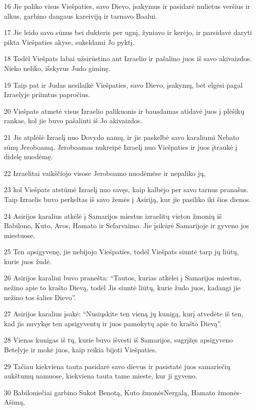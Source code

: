\par 16 Jie paliko visus Viešpaties, savo Dievo, įsakymus ir pasidarė nulietus veršius ir alkus, garbino dangaus kareiviją ir tarnavo Baalui. 
\par 17 Jie leido savo sūnus bei dukteris per ugnį, žyniavo ir kerėjo, ir parsidavė daryti pikta Viešpaties akyse, sukeldami Jo pyktį. 
\par 18 Todėl Viešpats labai užsirūstino ant Izraelio ir pašalino juos iš savo akivaizdos. Nieko neliko, išskyrus Judo giminę. 
\par 19 Taip pat ir Judas nesilaikė Viešpaties, savo Dievo, įsakymų, bet elgėsi pagal Izraelyje priimtus papročius. 
\par 20 Viešpats atmetė visus Izraelio palikuonis ir bausdamas atidavė juos į plėšikų rankas, kol jie buvo pašalinti iš Jo akivaizdos. 
\par 21 Jis atplėšė Izraelį nuo Dovydo namų, ir jie paskelbė savo karaliumi Nebato sūnų Jeroboamą. Jeroboamas nukreipė Izraelį nuo Viešpaties ir juos įtraukė į didelę nuodėmę. 
\par 22 Izraelitai vaikščiojo visose Jeroboamo nuodėmėse ir nepaliko jų, 
\par 23 kol Viešpats atstūmė Izraelį nuo savęs, kaip kalbėjo per savo tarnus pranašus. Taip Izraelis buvo perkeltas iš savo žemės į Asiriją, kur jie pasiliko iki šios dienos. 
\par 24 Asirijos karalius atkėlė į Samarijos miestus izraelitų vieton žmonių iš Babilono, Kuto, Avos, Hamato ir Sefarvaimo. Jie įsikūrė Samarijoje ir gyveno jos miestuose. 
\par 25 Ten apsigyvenę, jie nebijojo Viešpaties, todėl Viešpats siuntė tarp jų liūtų, kurie juos žudė. 
\par 26 Asirijos karaliui buvo pranešta: “Tautos, kurias atkėlei į Samarijos miestus, nežino apie to krašto Dievą, todėl Jis siuntė liūtų, kurie žudo juos, kadangi jie nežino tos šalies Dievo”. 
\par 27 Asirijos karalius įsakė: “Nusiųskite ten vieną jų kunigą, kurį atvedėte iš ten, kad jis nuvykęs ten apsigyventų ir juos pamokytų apie to krašto Dievą”. 
\par 28 Vienas kunigas iš tų, kurie buvo išvesti iš Samarijos, sugrįžęs apsigyveno Betelyje ir mokė juos, kaip reikia bijoti Viešpaties. 
\par 29 Tačiau kiekviena tauta pasidarė savo dievus ir pasistatė juos samariečių aukštumų namuose, kiekviena tauta tame mieste, kur ji gyveno. 
\par 30 Babiloniečiai garbino Sukot Benotą, Kuto žmonės­Nergalą, Hamato žmonės­Ašimą, 
